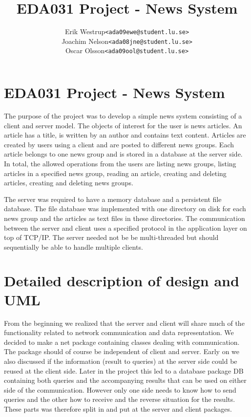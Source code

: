 \documentclass[10pt, a4paper]{article}
\title{EDA031 Project - News System}
\author{
	\begin{tabular}{l l}
		Erik Westrup & \texttt{<ada09ewe@student.lu.se>}\\
		Joachim Nelson & \texttt{<ada08jne@student.lu.se>} \\
		Oscar Olsson & \texttt{<ada09ool@student.lu.se>}
	\end{tabular}
}
\begin{document}
\begin{titlepage}
\maketitle
\thispagestyle{empty}	%
\end{titlepage}

\section{EDA031 Project - News System}
The purpose of the project was to develop a simple news system consisting of a client and server model. The objects of interest for the user is news articles. An article has a title, is written by an author and contains text content. Articles are created by users using a client and are posted to different news groups. Each article belongs to one news group and is stored in a database at the server side. In total, the allowed operations from the users are listing news groups, listing articles in a specified news group, reading an article, creating and deleting articles, creating and deleting news groups.

The server was required to have a memory database and a persistent file database. The file database was implemented with one directory on disk for each news group and the articles as text files in these directories. The communication between the server and client uses a specified protocol in the application layer on top of TCP/IP. The server needed not be be multi-threaded but should sequentially be able to handle multiple clients.

\section{Detailed description of design and UML}
From the beginning we realized that the server and client will share much of the functionality related to network communication and data representation. We decided to make a net package containing classes dealing with communication. The package should of course be independent of client and server. Early on we also discussed if the information (result to queries) at the server side could be reused at the client side. Later in the project this led to a database package DB containing both queries and the accompanying results that can be used on either side of the communication. However only one side needs to know how to send queries and the other how to receive and the reverse situation for the results. These parts was therefore split in and put at the server and client packages.
\end{document}
